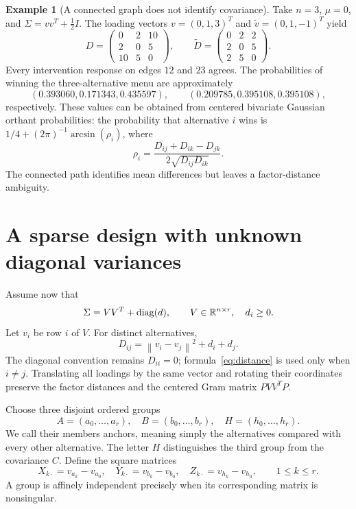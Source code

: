 \documentclass[11pt]{amsart}
\theoremstyle{definition}\newtheorem{example}[theorem]{Example}
\theoremstyle{remark}\newtheorem{remark}[theorem]{Remark}
\newcommand{\R}{\mathbb R}\newcommand{\E}{\mathbb E}\newcommand{\Prob}{\mathbb P}
\newcommand{\norm}[1]{\left\lVert#1\right\rVert}
\begin{document}
\begin{example}[A connected graph does not identify covariance]\label{ex:path}
Take $n=3$, $\mu=0$, and $\Sigma=vv^T+\tfrac12 I$. The loading vectors $v=(0,1,3)^T$ and $\widetilde v=(0,1,-1)^T$ yield
\[
 D=\begin{pmatrix}0&2&10\\2&0&5\\10&5&0\end{pmatrix},\qquad
 \widetilde D=\begin{pmatrix}0&2&2\\2&0&5\\2&5&0\end{pmatrix}.
\]
Every intervention response on edges $12$ and $23$ agrees. The probabilities of winning the three-alternative menu are approximately
\[
 (0.393060,0.171343,0.435597),\qquad (0.209785,0.395108,0.395108),
\]
respectively. These values can be obtained from centered bivariate Gaussian orthant probabilities: the probability that alternative $i$ wins is $1/4+(2\pi)^{-1}\arcsin(\rho_i)$, where
\[
 \rho_i=\frac{D_{ij}+D_{ik}-D_{jk}}{2\sqrt{D_{ij}D_{ik}}}.
\]
The connected path identifies mean differences but leaves a factor-distance ambiguity.
\end{example}

\section{A sparse design with unknown diagonal variances}\label{sec:anchors}
Assume now that
\begin{equation}\label{eq:factor}
 \Sigma=VV^T+\diag(d),\qquad V\in\R^{n\times r},\quad d_i\geq0.
\end{equation}
Let $v_i$ be row $i$ of $V$. For distinct alternatives,
\begin{equation}\label{eq:distance}
 D_{ij}=\norm{v_i-v_j}^2+d_i+d_j.
\end{equation}
The diagonal convention remains $D_{ii}=0$; formula~\eqref{eq:distance} is used only when $i\ne j$. Translating all loadings by the same vector and rotating their coordinates preserve the factor distances and the centered Gram matrix $PVV^TP$.

Choose three disjoint ordered groups
\[
 A=(a_0,\ldots,a_r),\quad B=(b_0,\ldots,b_r),\quad H=(h_0,\ldots,h_r).
\]
We call their members anchors, meaning simply the alternatives compared with every other alternative. The letter $H$ distinguishes the third group from the covariance $C$. Define the square matrices
\begin{equation}\label{eq:bases}
 X_{k\cdot}=v_{a_k}-v_{a_0},\quad
 Y_{k\cdot}=v_{b_k}-v_{b_0},\quad
 Z_{k\cdot}=v_{h_k}-v_{h_0},\qquad 1\leq k\leq r.
\end{equation}
A group is affinely independent precisely when its corresponding matrix is nonsingular.
\end{document}
